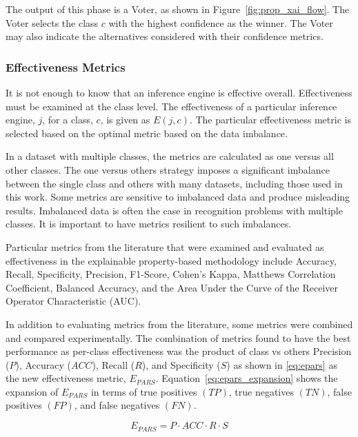 The output of this phase is a Voter, as shown in Figure~\ref{fig:prop_xai_flow}.
The Voter selects the class $c$ with the highest confidence as the winner. The
Voter may also indicate the alternatives considered with their confidence
metrics.

\subsubsection{Effectiveness Metrics}
\label{effectiveness_metrics}

It is not enough to know that an inference engine is effective overall.
Effectiveness must be examined at the class level. The effectiveness of a
particular inference engine, $j$, for a class, $c$, is given as $E(j,c)$. The
particular effectiveness metric is selected based on the optimal metric based on
the data imbalance.

In a dataset with multiple classes, the metrics are calculated as one versus all
other classes. The one versus others strategy imposes a significant imbalance
between the single class and others with many datasets, including those used in
this work. Some metrics are sensitive to imbalanced data and produce misleading
results. Imbalanced data is often the case in recognition problems with multiple
classes. It is important to have metrics resilient to such imbalances.

Particular metrics from the literature that were examined and evaluated as
effectiveness in the explainable property-based methodology include Accuracy,
Recall, Specificity, Precision, F1-Score, Cohen's Kappa, Matthews Correlation
Coefficient, Balanced Accuracy, and the Area Under the Curve of the Receiver
Operator Characteristic (AUC).

In addition to evaluating metrics from the literature, some metrics were
combined and compared experimentally. The combination of metrics found to have
the best performance as per-class effectiveness was the product of class vs
others Precision ($P$), Accuracy ($ACC$), Recall ($R$), and Specificity ($S$) as
shown in \eqref{eq:epars} as the new effectiveness metric, $E_{PARS}$.
Equation~\eqref{eq:epars_expansion} shows the expansion of $E_{PARS}$ in terms
of  true positives $(TP)$, true negatives $(TN)$, false positives $(FP)$, and
false negatives $(FN)$\cite{whitten24icmi}.

\begin{equation}\label{eq:epars}
    E_{PARS} = P \cdot ACC \cdot R \cdot S
\end{equation}

